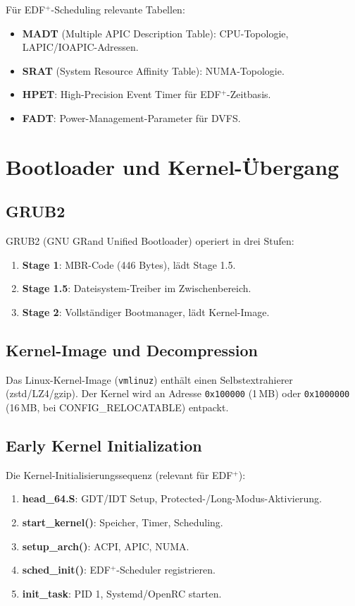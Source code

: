 ﻿\documentclass[a4paper,12pt]{scrreprt}
\theoremstyle{definition}
\begin{document}
	Für EDF$^+$-Scheduling relevante Tabellen:
	\begin{itemize}
		\item \textbf{MADT} (Multiple APIC Description Table): CPU-Topologie,
		LAPIC/IOAPIC-Adressen.
		\item \textbf{SRAT} (System Resource Affinity Table): NUMA-Topologie.
		\item \textbf{HPET}: High-Precision Event Timer für EDF$^+$-Zeitbasis.
		\item \textbf{FADT}: Power-Management-Parameter für DVFS.
	\end{itemize}
	
	\section{Bootloader und Kernel-Übergang}
	
	\subsection{GRUB2}
	
	GRUB2 (GNU GRand Unified Bootloader) operiert in drei Stufen:
	\begin{enumerate}
		\item \textbf{Stage 1}: MBR-Code (446 Bytes), lädt Stage 1.5.
		\item \textbf{Stage 1.5}: Dateisystem-Treiber im Zwischenbereich.
		\item \textbf{Stage 2}: Vollständiger Bootmanager, lädt Kernel-Image.
	\end{enumerate}
	
	\subsection{Kernel-Image und Decompression}
	
	Das Linux-Kernel-Image (\texttt{vmlinuz}) enthält einen Selbstextrahierer
	(zstd/LZ4/gzip). Der Kernel wird an Adresse \texttt{0x100000} (1\,MB) oder
	\texttt{0x1000000} (16\,MB, bei CONFIG\_RELOCA\newline TABLE) entpackt.
	
	\subsection{Early Kernel Initialization}
	
	Die Kernel-Initialisierungssequenz (relevant für EDF$^+$):
	\begin{enumerate}
		\item \textbf{head\_64.S}: GDT/IDT Setup, Protected-/Long-Modus-Aktivierung.
		\item \textbf{start\_kernel()}: Speicher, Timer, Scheduling.
		\item \textbf{setup\_arch()}: ACPI, APIC, NUMA.
		\item \textbf{sched\_init()}: EDF$^+$-Scheduler registrieren.
		\item \textbf{init\_task}: PID 1, Systemd/OpenRC starten.
	\end{enumerate}
	
\end{document}
